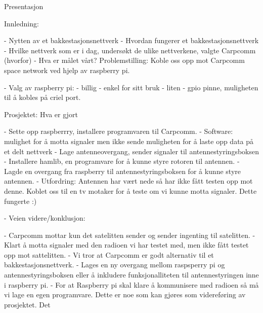 

Presentasjon

Innledning:

- Nytten av et bakkestasjonsnettverk
- Hvordan fungerer et bakkestasjonsnettverk
- Hvilke nettverk som er i dag, undersøkt de ulike nettverkene, valgte Carpcomm (hvorfor)
- Hva er målet vårt? Problemstilling: Koble oss opp mot Carpcomm space network ved hjelp av raspberry pi.

- Valg av raspberry pi:
		- billig
		- enkel for sitt bruk
		- liten
		- gpio pinne, muligheten til å kobles på criel port.

Prosjektet: Hva er gjort

- Sette opp raspberrry, installere programvaren til Carpcomm.
- Software:		
	mulighet for å motta signaler men ikke sende
	muligheten for å laste opp data på et delt nettverk
- Lage antenneovergang, sender signaler til antennestyringsboksen
- Installere hamlib, en programvare for å kunne styre rotoren til antennen.
- Lagde en overgang fra raspberry til antennestyringsboksen for å kunne styre antennen. 
- Utfordring: Antennen har vært nede så har ikke fått testen opp mot denne. Koblet oss til en tv motaker for å teste om vi kunne motta signaler. Dette fungerte :)

- Veien videre/konklusjon:

- Carpcomm mottar kun det satelitten sender og sender ingenting til satelitten. 
- Klart å motta signaler med den radioen vi har testet med, men ikke fått testet opp mot sattelitten. 
- Vi tror at Carpcomm er godt alternativ til et bakkestasjonsnettverk. 
- Lages en ny overgang mellom raspsperry pi og antennestyringsboksen eller å inkludere funksjonalliteten til antennestyringen inne i raspberry pi. 
- For at Raspberry pi skal klare å kommunisere med radioen så må vi lage en egen programvare. Dette er noe som kan gjøres som videreføring av prosjektet. Det





